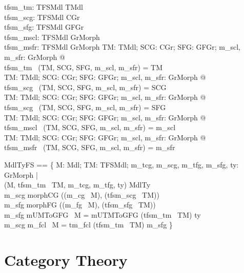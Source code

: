 \begin{axdef}
  tfsm\_tm: TFSMdl \fun  TMdl\\
  tfsm\_scg: TFSMdl \fun  CGr\\
  tfsm\_sfg: TFSMdl \fun  GFGr\\
  tfsm\_mscl: TFSMdl \fun  GrMorph\\
  tfsm\_msfr: TFSMdl \fun  GrMorph
\where
  \forall  TM: TMdl; SCG: CGr; SFG: GFGr; m\_scl, m\_sfr: GrMorph @ \\ \quad  
  tfsm\_tm~ (TM, SCG, SFG, m\_scl, m\_sfr) = TM\\
  \forall  TM: TMdl; SCG: CGr; SFG: GFGr; m\_scl, m\_sfr: GrMorph @ \\ \quad 
   tfsm\_scg~ (TM, SCG, SFG, m\_scl, m\_sfr) = SCG\\
  \forall  TM: TMdl; SCG: CGr; SFG: GFGr; m\_scl, m\_sfr: GrMorph @ \\ \quad 
  tfsm\_scg~ (TM, SCG, SFG, m\_scl, m\_sfr) = SFG\\
  \forall  TM: TMdl; SCG: CGr; SFG: GFGr; m\_scl, m\_sfr: GrMorph @\\ \quad 
   tfsm\_mscl~ (TM, SCG, SFG, m\_scl, m\_sfr) = m\_scl\\
  \forall  TM: TMdl; SCG: CGr; SFG: GFGr; m\_scl, m\_sfr: GrMorph @\\ \quad 
   tfsm\_msfr~ (TM, SCG, SFG, m\_scl, m\_sfr) = m\_sfr
\end{axdef}

\begin{zed}
MdlTyFS == \{  M: Mdl; TM: TFSMdl; m\_tcg, m\_scg, m\_tfg, m\_sfg, ty: GrMorph | \\ \quad 
(M, tfsm\_tm~ TM, m\_tcg, m\_tfg, ty) \in  MdlTy \\ \quad
\land  m\_scg \in  morphCG ((m\_cg~ M), (tfsm\_scg~ TM))  \\ \quad 
\land  m\_sfg \in  morphFG ((m\_fg~ M), (tfsm\_sfg~ TM)) \\ \quad 
\land  m\_sfg \OGM mUMToGFG~ M = mUTMToGFG (tfsm\_tm~ TM) \OGM ty \\ \quad  
\land  m\_scg \OGM m\_fcl~ M = tm\_fcl (tfsm\_tm~ TM) \OGM m\_sfg \}
\end{zed}


\section{Category Theory}

\begin{zed}
  [O, M]
\end{zed}

